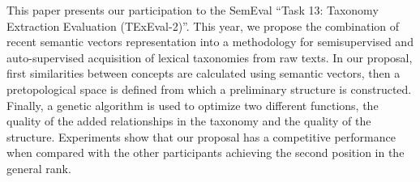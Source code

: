 This paper presents our participation to the SemEval ``Task 13: Taxonomy Extraction Evaluation (TExEval-2)''. This year, we propose the combination of recent semantic vectors representation into a methodology for semisupervised and auto-supervised acquisition of lexical taxonomies from raw texts. In our proposal, first similarities between concepts are calculated using semantic vectors, then a pretopological space is defined from which a preliminary structure is constructed. Finally, a genetic algorithm is used to optimize two different functions, the quality of the added relationships in the taxonomy and the quality of the structure. Experiments show that our proposal has a competitive performance when compared with the other participants achieving the second position in the general rank.
